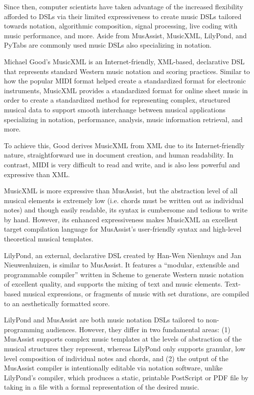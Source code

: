 \documentclass{article}
\begin{document}
Since then, computer scientists have taken advantage of the increased flexibility afforded to DSLs via their limited expressiveness to create music DSLs tailored towards notation, algorithmic composition, signal processing, live coding with music performance, and more. Aside from MusAssist, MusicXML, LilyPond, and PyTabs are commonly used music DSLs also specializing in notation.

Michael Good’s MusicXML is an Internet-friendly, XML-based, declarative DSL that represents standard Western music notation and scoring practices. Similar to how the popular MIDI format helped create a standardized format for electronic instruments, MusicXML provides a standardized format for online sheet music in order to create a standardized method for representing complex, structured musical data to support smooth interchange between musical applications specializing in notation, performance, analysis, music information retrieval, and more.\cite{good_2013}

To achieve this, Good derives MusicXML from XML due to its Internet-friendly nature, straightforward use in document creation, and human readability. In contrast, MIDI is very difficult to read and write, and is also less powerful and expressive than XML.  \cite{good_2001}

MusicXML is more expressive than MusAssist, but the abstraction level of all musical elements is extremely low (i.e. chords must be written out as individual notes) and though easily readable, its syntax is cumbersome and tedious to write by hand. However, its enhanced expressiveness makes MusicXML an excellent target compilation language for MusAssist’s user-friendly syntax and high-level theoretical musical templates.

LilyPond, an external, declarative DSL created by Han-Wen Nienhuys and Jan Nieuwenhuizen, is similar to MusAssist. It features a “modular, extensible and programmable compiler” written in Scheme to generate Western music notation of excellent quality, and supports the mixing of text and music elements. Text-based musical expressions, or fragments of music with set durations, are compiled to an aesthetically formatted score. \cite{nienhuys_nieuwenhuizen_2003}

LilyPond and MusAssist are both music notation DSLs tailored to non-programming audiences. However, they differ in two fundamental areas: (1) MusAssist supports complex music templates at the levels of abstraction of the musical structures they represent, whereas LilyPond only supports granular, low level composition of individual notes and chords, and (2) the output of the MusAssist compiler is intentionally editable via notation software, unlike LilyPond’s compiler, which produces a static, printable PostScript or PDF file by taking in a file with a formal representation of the desired music. 
\cite{nienhuys_nieuwenhuizen_2003}
\end{document}
